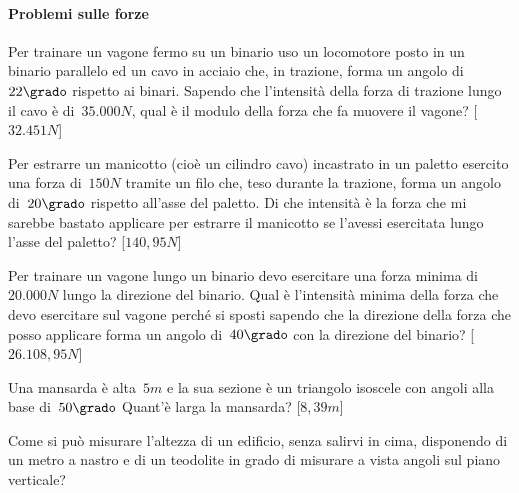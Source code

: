 \paragraph{Problemi sulle forze}

\begin{multicols}{2}
 \begin{esercizio}[\Ast]
\label{ese:G.51}
Per trainare un vagone fermo su un binario uso un locomotore posto in un binario 
parallelo ed un cavo in acciaio che, in trazione,
forma un angolo di~\(22\grado\) rispetto ai binari. Sapendo che l'intensità della 
forza di trazione lungo il cavo è di~\(35.000\unit{N}\),
qual è il modulo della forza che fa muovere il vagone?
\hfill [\(32.451\unit{N}\)]
\end{esercizio}

\begin{esercizio}[\Ast]
\label{ese:G.52}
Per estrarre un manicotto (cioè un cilindro cavo) incastrato in un paletto 
esercito una forza di~\(150\unit{N}\) tramite un filo che,
teso durante la trazione, forma un angolo di~\(20\grado\) rispetto all'asse del 
paletto. Di che intensità è la forza che mi sarebbe
bastato applicare per estrarre il manicotto se l'avessi esercitata lungo l'asse 
del paletto?
\hfill [\(140,95\unit{N}\)]
\end{esercizio}

\begin{esercizio}[\Ast]
\label{ese:G.53}
Per trainare un vagone lungo un binario devo esercitare una forza minima 
di~\(20.000\unit{N}\) lungo la direzione del binario.
Qual è l'intensità minima della forza che devo esercitare sul vagone perché si 
sposti sapendo che la direzione della forza che posso
applicare forma un angolo di~\(40\grado\) con la direzione del binario?
\hfill [\(26.108,95\unit{N}\)]
\end{esercizio}

\begin{esercizio}[\Ast]
\label{ese:G.54}
Una mansarda è alta~\(5\unit{m}\) e la sua sezione è un triangolo isoscele con 
angoli alla base di~\(50\grado\) Quant'è larga la mansarda?
\hfill [\(8,39\unit{m}\)]
\end{esercizio}

\begin{esercizio}
\label{ese:G.55}
Come si può misurare l'altezza di un edificio, senza salirvi in cima, disponendo 
di un metro a nastro e di un teodolite in grado di
misurare a vista angoli sul piano verticale?
\end{esercizio}


\end{multicols}
